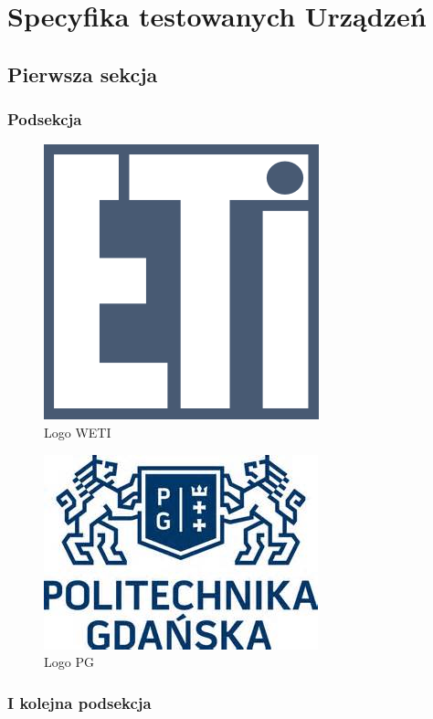 \section[Specyfika testowanych Urządzeń]{Specyfika testowanych Urządzeń}

\subsection[Pierwsza sekcja]{Pierwsza sekcja}
\subsubsection{Podsekcja}
\lipsum[6]

\begin{figure}[H]
	\includegraphics[scale=0.8]{imgs/eti.png}
	\caption{Logo WETI}
\end{figure}

\lipsum[3]

\begin{figure}[H]
	\includegraphics[scale=0.8]{imgs/pg.jpg}
	\caption{Logo PG}
\end{figure}

\lipsum[7]

\subsubsection{I kolejna podsekcja}
\lipsum[2]

